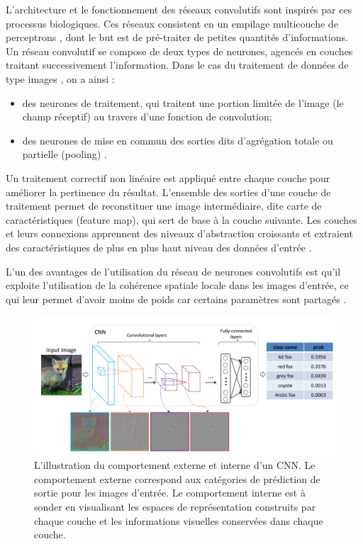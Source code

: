 	L'architecture et le fonctionnement des réseaux convolutifs sont inspirés par ces processus biologiques. Ces réseaux consistent en un empilage multicouche de perceptrons \cite{tammina2019transfer}, dont le but est de pré-traiter de petites quantités d'informations.\\
	Un réseau convolutif se compose de deux types de neurones, agencés en couches traitant successivement l'information. Dans le cas du traitement de données de type images \cite{antoine2018apprentissage}, on a ainsi : 
	
	\begin{itemize}
		\item des neurones de traitement, qui traitent une portion limitée de l'image (le champ réceptif) au travers d'une fonction de convolution\cite{tammina2019transfer, antoine2018apprentissage};
		\item des neurones de mise en commun des sorties dits d'agrégation totale ou partielle (pooling) \cite{tammina2019transfer, antoine2018apprentissage}.
		
	\end{itemize}

	
	Un traitement correctif non linéaire est appliqué entre chaque couche pour améliorer la pertinence du résultat. L'ensemble des sorties d'une couche de traitement permet de reconstituer une image intermédiaire, dite carte de caractéristiques (feature map), qui sert de base à la couche suivante. Les couches et leurs connexions apprennent des niveaux d'abstraction croissants et extraient des caractéristiques de plus en plus haut niveau des données d'entrée \cite{antoine2018apprentissage, shin2016deep}.
	
	L'un des avantages de l'utilisation du réseau de neurones convolutifs est qu'il exploite l'utilisation de la cohérence spatiale locale dans les images d'entrée, ce qui leur permet d'avoir moins de poids car certains paramètres sont partagés \cite{tammina2019transfer}.
	
	
	\begin{figure}[H]%
		\centering
		\includegraphics[width=\textwidth]{images/cnn-fox}
		\caption[L'illustration du comportement externe et interne d'un CNN.]{L'illustration du comportement externe et interne d'un CNN. Le comportement externe correspond aux catégories de prédiction de sortie pour les images d'entrée. Le comportement interne est à sonder en visualisant les espaces de représentation construits par chaque couche et les informations visuelles conservées dans chaque couche. \cite{yu2016visualizing}}
		\label{fig:cnn_exemple}
	\end{figure}
	

